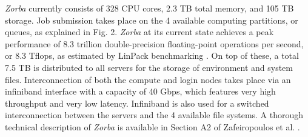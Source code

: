    \begin{figure}
      
   \end{figure}



   \textit{Zorba} currently consists of 328 CPU cores, 2.3 TB total memory, and 105 TB storage. 
   Job submission takes place on the 4 available computing partitions, or queues, as explained in Fig. 2. \textit{Zorba} at its current state achieves a peak performance of 8.3 trillion double-precision floating-point operations per second, or 8.3 Tflops, as estimated by LinPack benchmarking \citep{dongarra2003linpack}. 
   On top of these, a total 7.5 TB is distributed to all servers for the storage of environment and system files. 
   Interconnection of both the compute and login nodes takes place via an infiniband interface with a capacity of 40 Gbps, which features very high throughput and very low latency. 
   Infiniband is also used for a switched interconnection between the servers and the 4 available file systems. 
   A thorough technical description of \textit{Zorba} is available in Section A2 of Zafeiropoulos et al.  \citep{haris_zafeiropoulos_2021_4665308}.


